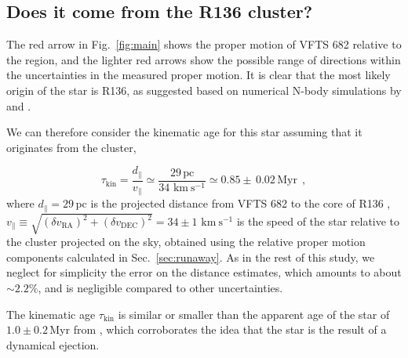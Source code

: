 \documentclass[apjl,twocolumn]{emulateapj}
\newcommand{\kms}{{\,\mathrm{km\ s^{-1}}}}
\DeclareRobustCommand{\Figref}[1]{Fig.~\ref{#1}}
\DeclareRobustCommand{\Secref}[1]{Sec.~\ref{#1}}
\begin{document}
\subsection{Does it come from the R136 cluster?}
\label{sec:r136_origin}

The red arrow in \Figref{fig:main} shows the proper motion of VFTS 682
relative to the region, and the lighter red arrows show the possible
range of directions within the uncertainties in the measured proper
motion. It is clear that the most likely origin of the star is R136,
as suggested based on numerical N-body simulations by \cite{fujii:11}
and \cite{banerjee:12}.

We can therefore consider the kinematic age for this star assuming
that it originates from the cluster,

\begin{equation}
  \label{eq:kin_age}
  \tau_\mathrm{kin} = \frac{d_\parallel}{v_\parallel} \simeq
  \frac{29\,\mathrm{pc}}{34\,\kms} \simeq 0.85\pm\,0.02\, \mathrm{Myr} \ \ ,
\end{equation}
where $d_\parallel =29$\,pc is the projected distance from VFTS 682 to
the core of R136 \citep[][]{bestenlehner:11}, $v_\parallel \equiv \sqrt{\left(\delta v_\mathrm{RA}\right)^2
    +\left(\delta v_\mathrm{DEC}\right)^2} =34\pm
1\,\kms$ is the speed of the star relative to the cluster projected on the sky, obtained
using the relative proper motion components calculated in
\Secref{sec:runaway}.%
As in the rest of this study, we neglect for
simplicity the error on the distance estimates, which amounts to about
$\sim$$2.2\%$, and is negligible compared to other uncertainties.

The kinematic age $\tau_\mathrm{kin}$ is similar or smaller than the apparent age
of the star of $1.0\pm 0.2$\,Myr from \cite{schneider:18}, which
corroborates the idea that the star is the result of a dynamical
ejection. 
\end{document}
